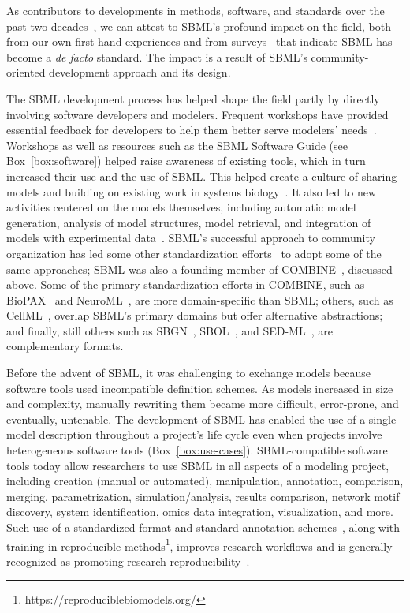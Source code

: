 \documentclass{sbml-paper}
\begin{document}
As contributors to developments in methods, software, and standards over the past two decades~\citep{Hucka2015promotinga, Brazma2006standards}, we can attest to SBML's profound impact on the field, both from our own first-hand experiences and from surveys~\citep{Klipp2007systems} that indicate SBML has become a \emph{de facto} standard.  The impact is a result of SBML's community-oriented development approach and its design.

The SBML development process has helped shape the field partly by directly involving software developers and modelers.  Frequent workshops have provided essential feedback for developers to help them better serve modelers' needs~\citep[e.g.,][]{waltemath2014meeting}.  Workshops as well as resources such as the SBML Software Guide (see Box~\ref{box:software}) helped raise awareness of existing tools, which in turn increased their use and the use of SBML.  This helped create a culture of sharing models and building on existing work in systems biology~\citep{stanford2015evolution}.  It also led to new activities centered on the models themselves, including automatic model generation, analysis of model structures, model retrieval, and integration of models with experimental data~\citep{Draeger2014}.  SBML's successful approach to community organization has led some other standardization efforts~\citep[e.g.,][]{Demir2010, Gleeson2010, Roehner2016, VanIersel2012} to adopt some of the same approaches; SBML was also a founding member of COMBINE~\citep{Hucka2015promotinga}, discussed above.  Some of the primary standardization efforts in COMBINE, such as BioPAX~\citep{Demir2010} and NeuroML~\citep{Gleeson2010}, are more domain-specific than SBML; others, such as CellML~\citep{Lloyd2004-fd}, overlap SBML's primary domains but offer alternative abstractions; and finally, still others such as SBGN~\citep{VanIersel2012}, SBOL~\citep{Roehner2016}, and SED-ML~\citep{waltemath2011reproducible}, are complementary formats.

Before the advent of SBML, it was challenging to exchange models because software tools used incompatible definition schemes.  As models increased in size and complexity, manually rewriting them became more difficult, error-prone, and eventually, untenable.  The development of SBML has enabled the use of a single model description throughout a project's life cycle even when projects involve heterogeneous software tools (Box~\ref{box:use-cases}).  SBML-compatible software tools today allow researchers to use SBML in all aspects of a modeling project, including creation (manual or automated), manipulation, annotation, comparison, merging, parametrization, simulation/analysis, results comparison, network motif discovery, system identification, omics data integration, visualization, and more.  Such use of a standardized format and standard annotation schemes~\citep{Neal2019harmonizing}, along with training in reproducible methods\footnote{https://reproduciblebiomodels.org/}, improves research workflows and is generally recognized as promoting research reproducibility~\citep{Sandve2013ten, Mendes2018reproducible, waltemath2016modeling}.
\end{document}
